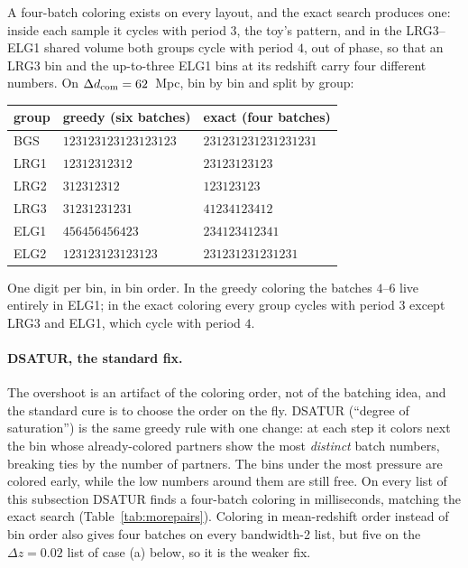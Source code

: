\documentclass[11pt]{article}
\begin{document}
A four-batch coloring exists on every layout, and the exact search
produces one: inside each sample it cycles with period $3$, the toy's
pattern, and in the LRG3--ELG1 shared volume both groups cycle with
period $4$, out of phase, so that an LRG3 bin and the up-to-three ELG1
bins at its redshift carry four different numbers.  On
$\Delta d_{\rm com} = 62$~Mpc, bin by bin and split by group:
\begin{center}
  \begin{tabular}{lll}
    \hline
    group & greedy (six batches) & exact (four batches) \\
    \hline
    BGS  & $123123123123123123$ & $231231231231231231$ \\
    LRG1 & $12312312312$ & $23123123123$ \\
    LRG2 & $312312312$   & $123123123$ \\
    LRG3 & $31231231231$ & $41234123412$ \\
    ELG1 & $456456456423$ & $234123412341$ \\
    ELG2 & $123123123123123$ & $231231231231231$ \\
    \hline
  \end{tabular}
\end{center}
One digit per bin, in bin order.  In the greedy coloring the batches
$4$--$6$ live entirely in ELG1; in the exact coloring every group
cycles with period $3$ except LRG3 and ELG1, which cycle with
period $4$.

\paragraph{DSATUR, the standard fix.}
The overshoot is an artifact of the coloring order, not of the
batching idea, and the standard cure is to choose the order on the
fly.  DSATUR (``degree of saturation'') is the same greedy rule with
one change: at each step it colors next the bin whose already-colored
partners show the most \emph{distinct} batch numbers, breaking ties by
the number of partners.  The bins under the most pressure are colored
early, while the low numbers around them are still free.  On every
list of this subsection DSATUR finds a four-batch coloring in
milliseconds, matching the exact search (Table~\ref{tab:morepairs}).
Coloring in mean-redshift order instead of bin order also gives four
batches on every bandwidth-2 list, but five on the $\Delta z = 0.02$
list of case (a) below, so it is the weaker fix.
\end{document}
